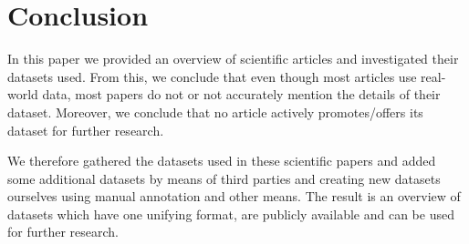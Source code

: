 \section{Conclusion}
	
	In this paper we provided an overview of scientific articles and investigated their datasets used.
	From this, we conclude that even though most articles use real-world data, most papers do not or not accurately mention the details of their dataset.
	Moreover, we conclude that no article actively promotes/offers its dataset for further research.
	
	We therefore gathered the datasets used in these scientific papers and added some additional datasets by means of third parties and creating new datasets ourselves using manual annotation and other means.
	The result is an overview of datasets which have one unifying format, are publicly available and can be used for further research.